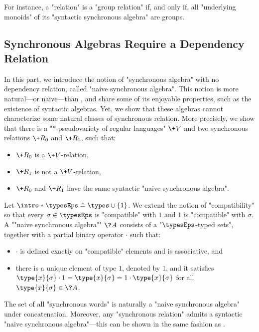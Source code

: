 For instance, a "relation" is a "group relation" if, and only if, all
"underlying monoids" of its "syntactic synchronous algebra" are
groups. 

\subsection{Synchronous Algebras Require a Dependency Relation}
\label{sec:counterexample}

In this part, we introduce the notion of "synchronous algebra" with no dependency relation, 
called "naive synchronous algebra". This notion is more natural---or naive---than
, and share some of its enjoyable properties, such as the existence of syntactic algebras. Yet, we show that these algebras cannot characterize some
natural classes of synchronous relation. More precisely, we show that there
is a "$\ast$-pseudovariety of regular languages" $\+V$ and two synchronous relations
$\+R_0$ and $\+R_1$, such that:
\begin{itemize}
	\item $\+R_0$ is a $\+V$-relation,
	\item $\+R_1$ is not a $\+V$-relation,
	\item $\+R_0$ and $\+R_1$ have the same syntactic "naive synchronous algebra".
\end{itemize}

\begin{definition}
	Let $\intro*\typesEps \defeq \types \cup \{1\}$. We extend the notion of "compatibility" so 
	that every $\sigma \in \typesEps$ is "compatible" with $1$ and
	$1$ is "compatible" with $\sigma$.
	A \AP""naive synchronous algebra"" $\?A$ consists of a "$\typesEps$-typed sets",
	together with a partial binary operator $\cdot$ such that:
	\begin{itemize}
		\item $\cdot$ is defined exactly on "compatible" elements and is associative, and
		\item there is a unique element of type $1$, denoted by $1$, and it satisfies
			$\type{x}{\sigma} \cdot 1 = \type{x}{\sigma} = 1 \cdot \type{x}{\sigma}$
			for all $\type{x}{\sigma} \in \?A$.
	\end{itemize}
\end{definition}

The set of all "synchronous words" is naturally a "naive synchronous algebra" under concatenation.
Moreover, any "synchronous relation" admits a syntactic "naive synchronous algebra"---this can be shown in the same fashion as .

